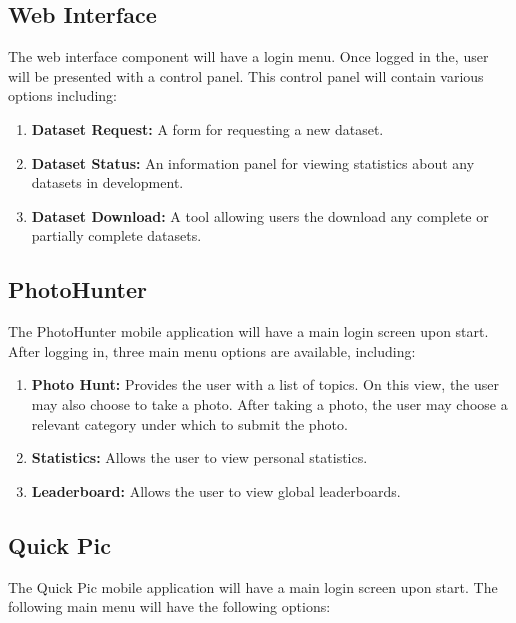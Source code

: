 \documentclass{article}
\begin{document}
\subsection{Web Interface}
The web interface component will have a login menu. Once logged in the, user
will be presented with a control panel. This control panel will contain various
options including:

\begin{enumerate}

  \item \textbf{Dataset Request:} A form for requesting a new dataset.
  
  \item \textbf{Dataset Status:} An information panel for viewing statistics
        about any datasets in development.
  
  \item \textbf{Dataset Download:} A tool allowing users the download any
        complete or partially complete datasets.

\end{enumerate}
	
\subsection{PhotoHunter}
The PhotoHunter mobile application will have a main login screen upon start.
After logging in, three main menu options are available, including:

\begin{enumerate}

  \item \textbf{Photo Hunt:} Provides the user with a list of topics. On this
        view, the user may also choose to take a photo. After taking a photo, the user
        may choose a relevant category under which to submit the photo.

  \item \textbf{Statistics:} Allows the user to view personal statistics.

  \item \textbf{Leaderboard:} Allows the user to view global leaderboards.

\end{enumerate}
	
\subsection{Quick Pic}
The Quick Pic mobile application will have a main login screen upon start. The
following main menu will have the following options:
\end{document}
